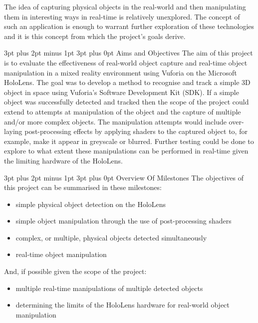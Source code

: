 \documentclass[12pt,a4paper,oneside]{article}
\makeatletter
\renewcommand\subsubsection{\@startsection {subsubsection}{1}{0mm} %
	                           {3pt plus 2pt minus 1pt} %
	                           {3pt plus 0pt} %
	                           {\normalfont\bfseries}}
\renewcommand\subsection{\@startsection {subsection}{1}{0mm} %
                               {3pt plus 2pt minus 1pt} %
                               {3pt plus 0pt} %
                               {\large\bfseries}}
\makeatother
\begin{document}
The idea of capturing physical objects in the real-world and then manipulating them in interesting ways in real-time is relatively unexplored. The concept of such an application is enough to warrant further exploration of these technologies and it is this concept from which the project's goals derive.

\subsection{Aims and Objectives}
The aim of this project is to evaluate the effectiveness of real-world object capture and real-time object manipulation in a mixed reality environment using Vuforia on the Microsoft HoloLens. The goal was to develop a method to recognise and track a simple 3D object in space using Vuforia's Software Development Kit (SDK). If a simple object was successfully detected and tracked then the scope of the project could extend to attempts at manipulation of the object and the capture of multiple and/or more complex objects. The manipulation attempts would include over-laying post-processing effects by applying shaders to the captured object to, for example, make it appear in greyscale or blurred. Further testing could be done to explore to what extent these manipulations can be performed in real-time given the limiting hardware of the HoloLens.

\subsubsection{Overview Of Milestones}
The objectives of this project can be summarised in these milestones:
\begin{itemize}\itemsep0pt
	\item simple physical object detection on the HoloLens
	\item simple object manipulation through the use of post-processing shaders
	\item complex, or multiple, physical objects detected simultaneously
	\item real-time object manipulation
\end{itemize}
And, if possible given the scope of the project:
\begin{itemize}\itemsep0pt
	\item multiple real-time manipulations of multiple detected objects
	\item determining the limits of the HoloLens hardware for real-world object manipulation
\end{itemize}
\end{document}
